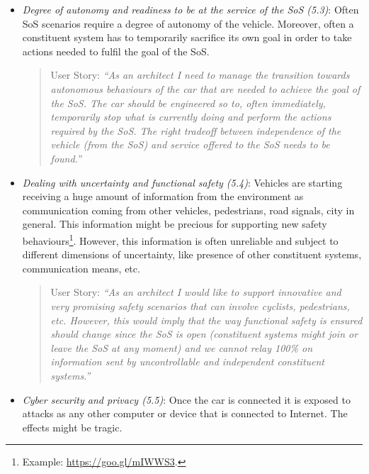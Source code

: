 \begin{itemize}
\begin{itemize}
\item {\em Degree of autonomy and readiness to be at the service of the SoS (5.3)}: Often SoS scenarios require a degree of autonomy of the vehicle. Moreover, often a constituent system has to temporarily sacrifice its own goal in order to take actions needed to fulfil the goal of the SoS.

\begin{quote}
{User Story:} 
\emph{``As an architect I need to manage the transition towards autonomous behaviours of the car that are needed to achieve the goal of the SoS. The car should be engineered so to, often immediately, temporarily stop what is currently doing and %
perform the actions required by the SoS. The right tradeoff between independence of the vehicle (from the SoS) and service offered to the SoS needs to be found.''}
\end{quote}

\item {\em Dealing with uncertainty and functional safety (5.4)}: Vehicles are starting receiving a huge amount of information from the environment as communication coming from other vehicles, pedestrians, road signals, city in general. This information might be precious for supporting new safety behaviours\footnote{Example: \url{https://goo.gl/mIWWS3}.}.  %
However, this information is often unreliable and subject to different dimensions of uncertainty, like presence of other constituent systems, communication means, etc.

\begin{quote}
{User Story:} 
\emph{``As an architect I would like to support innovative and very promising safety scenarios that can involve cyclists, pedestrians, etc. However, this would imply that the way functional safety is ensured should change since the SoS is open (constituent systems might join or leave the SoS at any moment) and we cannot relay 100\% on information sent by uncontrollable and independent constituent systems.''}
\end{quote}


\item {\em Cyber security and privacy (5.5)}: Once the car is connected it is exposed to attacks as any other computer or device that is connected to Internet. The effects might be tragic.


\end{itemize}
\end{itemize}
